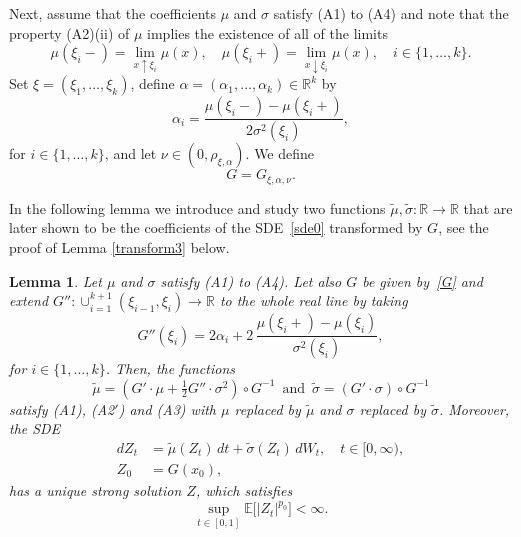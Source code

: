 \documentclass[11pt]{amsart}
\newcommand{\R}{{\mathbb R}}
\newcommand{\EE}{{\mathbb E}}
\theoremstyle{plain}
\newtheorem{lemma}{Lemma}
\theoremstyle{definition}
\begin{document}
Next, assume that the coefficients $\mu$ and $\sigma$ satisfy (A1) to (A4) and note that the property (A2)(ii) of $\mu$ implies the existence of all of the limits
\[
\mu(\xi_i-)=\lim_{x\uparrow \xi_i} \mu(x),\quad \mu(\xi_i+)=\lim_{x\downarrow \xi_i} \mu(x), \quad i\in\{1,\dots,k\}.
\]
Set $\xi=(\xi_1,\dots,\xi_k)$,  define $\alpha=(\alpha_1,\dots,\alpha_k)\in \R^k$ by
\[
\alpha_i =\frac{\mu(\xi_i-)-\mu(\xi_i+)}{2 \sigma^2(\xi_i)},
\]
 for  $i\in\{1,\dots,k\}$, and let $\nu\in (0,\rho_{\xi,\alpha})$.  We define
 \begin{equation}\label{G}
 G=G_{\xi,\alpha,\nu}.
 \end{equation}




 In the following lemma we introduce and study two functions $\widetilde \mu,\widetilde \sigma\colon\R\to\R$ that are later shown to be the coefficients of the SDE~\eqref{sde0} transformed by $G$, see the proof of
  Lemma \ref{transform3} below.


\begin{lemma}\label{transform1} Let $\mu$ and $\sigma$ satisfy (A1) to (A4). Let also $G$ be given by~\eqref{G} and extend $G''\colon \cup_{i=1}^{k+1} (\xi_{i-1},\xi_i)\to \R$ to the whole real line by taking
 \begin{equation}\label{xxc}
 G''(\xi_i) = 2\alpha_i + 2\,\frac{\mu(\xi_i+)-\mu(\xi_i)}{\sigma^2(\xi_i)},
\end{equation}
for $i\in\{1, \ldots, k\}$. Then, the functions
\begin{equation}\label{tildecoeff}
\widetilde \mu=(G'\cdot \mu+\tfrac{1}{2}G''\cdot\sigma^2)\circ G^{-1} \, \text{ and }\, \widetilde\sigma=(G'\cdot\sigma)\circ G^{-1}
\end{equation}
satisfy  (A1), (A2$'$) and (A3) with $\mu$ replaced by $\widetilde \mu$ and $\sigma$ replaced by $\widetilde \sigma$.
Moreover, the  SDE
\begin{equation}\label{sde1}
	\begin{aligned}
		dZ_t & = \widetilde\mu(Z_t) \, dt + \widetilde\sigma(Z_t) \, dW_t, \quad t\in [0,\infty),\\
		Z_0 & = G(x_0),
	\end{aligned}
\end{equation}
has a unique strong solution $Z$,
 which satisfies
	\begin{equation}\label{mm2}
		\sup_{t\in[0,1]}\EE\bigl[|Z_t|^{p_0}\bigr]<\infty.
	\end{equation}
\end{lemma}
\end{document}

